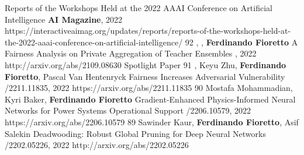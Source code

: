 \begin{pubs}
	{Reports of the Workshops Held at the 2022 AAAI Conference on Artificial Intelligence}
	{{\bf AI Magazine}, 2022}
	{https://interactiveaimag.org/updates/reports/reports-of-the-workshops-held-at-the-2022-aaai-conference-on-artificial-intelligence/}
\wsentryAwd
	{92} %
	{, , {\bf Ferdinando Fioretto}}
	{A Fairness Analysis on Private Aggregation of Teacher Ensembles}
	{, 2022}
	{http://arxiv.org/abs/2109.08630}
	{Spotlight Paper}
\wsentry 
	{91}%
	{, Keyu Zhu, {\bf Ferdinando Fioretto}, Pascal Van Hentenryck}
	{Fairness Increases Adversarial Vulnerability}
	{/2211.11835, 2022}
	{https://arxiv.org/abs/2211.11835}
\wsentry
	{90}%
	{Mostafa Mohammadian, Kyri Baker, {\bf Ferdinando Fioretto}}
	{Gradient-Enhanced Physics-Informed Neural Networks for Power Systems Operational Support}
	{/2206.10579, 2022}
	{https://arxiv.org/abs/2206.10579}
\wsentry 
	{89}%
	{Sawinder Kaur, {\bf Ferdinando Fioretto}, Asif Salekin}
	{Deadwooding: Robust Global Pruning for Deep Neural Networks} 
	{/2202.05226, 2022}
	{http://arxiv.org/abs/2202.05226}



\end{pubs}
